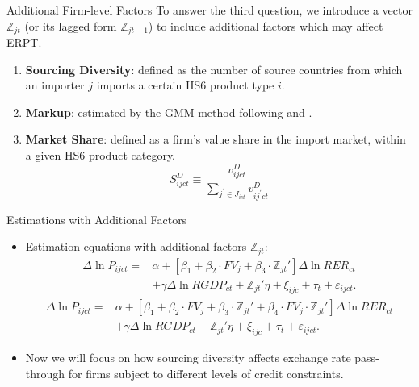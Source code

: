 \documentclass[10pt]{beamer}
\begin{document}
\begin{frame}{Additional Firm-level Factors}
	To answer the third question, we introduce a vector $\mathbb{Z}_{jt}$ (or its lagged form $\mathbb{Z}_{jt-1}$) to include additional factors which may affect ERPT.
	\begin{enumerate}
		\item \textbf{Sourcing Diversity}: defined as the number of source countries from which an importer $j$ imports a certain HS6 product type $i$. 
		\item \textbf{Markup}: estimated by the GMM method following \cite{dlw2012} and \cite{bkl2021}.
		\item \textbf{Market Share}: defined as a firm’s value share in the import market, within a given HS6 product category.
		$$
		S^{D}_{ijct} \equiv \frac{v^{D}_{ijct}}{\sum_{j^{\prime} \in J_{ict}} v^{D}_{ij^{\prime}ct}}
		$$
	\end{enumerate}
\end{frame}

\begin{frame}{Estimations with Additional Factors}
	\begin{itemize}
		\item Estimation equations with additional factors $\mathbb{Z}_{jt}$:
		\begin{equation}
			\begin{aligned}
				\Delta \ln P_{ijct}=&\alpha+[\beta_{1}+ \beta_{2} \cdot FV_{j}+\beta_{3} \cdot {\mathbb{Z}_{jt}}'] \Delta \ln RER_{ct} \\&+\gamma \Delta \ln RGDP_{ct}+ {\mathbb{Z}_{jt}}' \eta+\xi_{ijc}+\tau_{t} +\varepsilon_{ijct}.
			\end{aligned}	
			\label{eq.add.control}
		\end{equation}
		\begin{equation}
			\begin{aligned}
				\Delta \ln P_{ijct}=&\alpha+[\beta_{1}+ \beta_{2} \cdot FV_{j}+\beta_{3} \cdot {\mathbb{Z}_{jt}}'+\beta_{4} \cdot FV_{j} \cdot {\mathbb{Z}_{jt}}'] \Delta \ln RER_{ct} \\ &+\gamma \Delta \ln RGDP_{ct}+ {\mathbb{Z}_{jt}}' \eta+\xi_{ijc}+\tau_{t} +\varepsilon_{ijct}.
			\end{aligned}	
			\label{eq.add.interaction}
		\end{equation}
		\item Now we will focus on how sourcing diversity affects exchange rate pass-through for firms subject to different levels of credit constraints.
	\end{itemize}
\end{frame}
\end{document}
